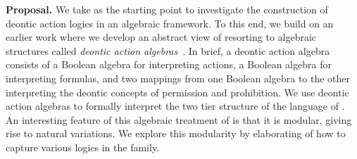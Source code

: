 \medskip\noindent
\textbf{Proposal.}
We take \DAL as the starting point to investigate the construction of deontic action logics in an algebraic framework.
To this end, we build on an earlier work where we develop an abstract view of \DAL resorting to algebraic structures called \emph{deontic action algebras}~\cite{CCFA:2021}.
In brief, a deontic action algebra consists of a Boolean algebra for interpreting actions, a Boolean algebra for interpreting formulas, and two mappings from one Boolean algebra to the other interpreting the deontic concepts of permission and prohibition.
We use deontic action algebras to formally interpret the two tier structure of the language of \DAL.
An interesting feature of this algebraic treatment of \DAL is that it is modular, giving rise to natural variations.
We explore this modularity by elaborating of how to capture various logics in the \DAL family.


